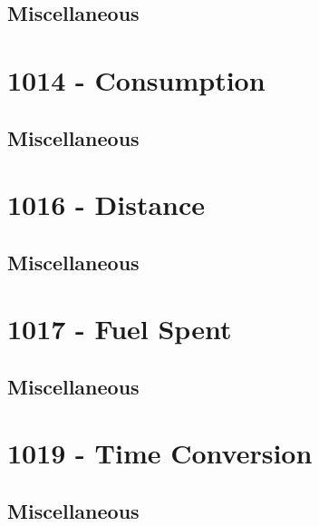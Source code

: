 \subsection{Miscellaneous}
\raggedbottom
\vspace{-.7\baselineskip}\hrulefill
\vspace{0.1\baselineskip}
\section{1014 - Consumption}
\subsection{Miscellaneous}
\raggedbottom
\vspace{-.7\baselineskip}\hrulefill
\vspace{0.1\baselineskip}
\section{1016 - Distance}
\subsection{Miscellaneous}
\raggedbottom
\vspace{-.7\baselineskip}\hrulefill
\vspace{0.1\baselineskip}
\section{1017 - Fuel Spent}
\subsection{Miscellaneous}
\raggedbottom
\vspace{-.7\baselineskip}\hrulefill
\vspace{0.1\baselineskip}
\section{1019 - Time Conversion}
\subsection{Miscellaneous}
\raggedbottom
\vspace{-.7\baselineskip}\hrulefill
\vspace{0.1\baselineskip}
